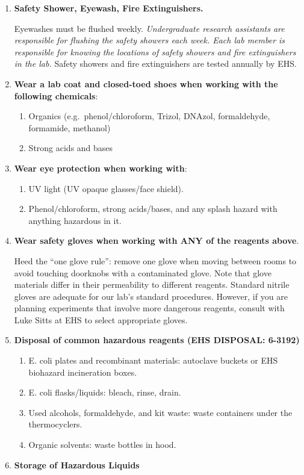 \documentclass[
  letterpaper,
  DIV=11,
  numbers=noendperiod]{scrreprt}
\providecommand{\tightlist}{%
  \setlength{\itemsep}{0pt}\setlength{\parskip}{0pt}}\usepackage{longtable,booktabs,array}
\begin{document}
\begin{enumerate}
\def\labelenumi{\arabic{enumi}.}
\item
  \textbf{Safety Shower, Eyewash, Fire Extinguishers.}

  Eyewashes must be flushed weekly. \emph{Undergraduate research
  assistants are responsible for flushing the safety showers each week.
  Each lab member is responsible for knowing the locations of safety
  showers and fire extinguishers in the lab.} Safety showers and fire
  extinguishers are tested annually by EHS.
\item
  \textbf{Wear a lab coat and closed-toed shoes when working with the
  following chemicals}:

  \begin{enumerate}
  \def\labelenumii{\arabic{enumii}.}
  \tightlist
  \item
    Organics (e.g.~phenol/chloroform, Trizol, DNAzol, formaldehyde,
    formamide, methanol)
  \item
    Strong acids and bases
  \end{enumerate}
\item
  \textbf{Wear eye protection when working with}:

  \begin{enumerate}
  \def\labelenumii{\arabic{enumii}.}
  \tightlist
  \item
    UV light (UV opaque glasses/face shield).
  \item
    Phenol/chloroform, strong acids/bases, and any splash hazard with
    anything hazardous in it.
  \end{enumerate}
\item
  \textbf{Wear safety gloves when working with ANY of the reagents
  above}.

  Heed the ``one glove rule'': remove one glove when moving between
  rooms to avoid touching doorknobs with a contaminated glove. Note that
  glove materials differ in their permeability to different reagents.
  Standard nitrile gloves are adequate for our lab's standard
  procedures. However, if you are planning experiments that involve more
  dangerous reagents, consult with Luke Sitts at EHS to select
  appropriate gloves.
\item
  \textbf{Disposal of common hazardous reagents (EHS DISPOSAL: 6-3192)}

  \begin{enumerate}
  \def\labelenumii{\arabic{enumii}.}
  \tightlist
  \item
    E. coli plates and recombinant materials: autoclave buckets or EHS
    biohazard incineration boxes.
  \item
    E. coli flasks/liquids: bleach, rinse, drain.
  \item
    Used alcohols, formaldehyde, and kit waste: waste containers under
    the thermocyclers.\\
  \item
    Organic solvents: waste bottles in hood.
  \end{enumerate}
\item
  \textbf{Storage of Hazardous Liquids}


\end{enumerate}
\end{document}
